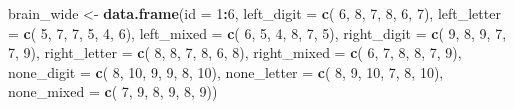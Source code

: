 \documentclass[
]{article}
\newenvironment{Shaded}{\begin{snugshade}}{\end{snugshade}}
\newcommand{\DataTypeTok}[1]{\textcolor[rgb]{0.13,0.29,0.53}{#1}}
\newcommand{\DecValTok}[1]{\textcolor[rgb]{0.00,0.00,0.81}{#1}}
\newcommand{\KeywordTok}[1]{\textcolor[rgb]{0.13,0.29,0.53}{\textbf{#1}}}
\newcommand{\NormalTok}[1]{#1}
\newcommand{\OperatorTok}[1]{\textcolor[rgb]{0.81,0.36,0.00}{\textbf{#1}}}
\newcommand{\StringTok}[1]{\textcolor[rgb]{0.31,0.60,0.02}{#1}}
\begin{document}
\begin{Shaded}
\begin{Highlighting}[]
\NormalTok{brain_wide <-}\StringTok{ }\KeywordTok{data.frame}\NormalTok{(}\DataTypeTok{id =} \DecValTok{1}\OperatorTok{:}\DecValTok{6}\NormalTok{,}
                         \DataTypeTok{left_digit   =} \KeywordTok{c}\NormalTok{( }\DecValTok{6}\NormalTok{,  }\DecValTok{8}\NormalTok{,  }\DecValTok{7}\NormalTok{,  }\DecValTok{8}\NormalTok{,  }\DecValTok{6}\NormalTok{,  }\DecValTok{7}\NormalTok{),}
                         \DataTypeTok{left_letter  =} \KeywordTok{c}\NormalTok{( }\DecValTok{5}\NormalTok{,  }\DecValTok{7}\NormalTok{,  }\DecValTok{7}\NormalTok{,  }\DecValTok{5}\NormalTok{,  }\DecValTok{4}\NormalTok{,  }\DecValTok{6}\NormalTok{),}
                         \DataTypeTok{left_mixed   =} \KeywordTok{c}\NormalTok{( }\DecValTok{6}\NormalTok{,  }\DecValTok{5}\NormalTok{,  }\DecValTok{4}\NormalTok{,  }\DecValTok{8}\NormalTok{,  }\DecValTok{7}\NormalTok{,  }\DecValTok{5}\NormalTok{),}
                         \DataTypeTok{right_digit  =} \KeywordTok{c}\NormalTok{( }\DecValTok{9}\NormalTok{,  }\DecValTok{8}\NormalTok{,  }\DecValTok{9}\NormalTok{,  }\DecValTok{7}\NormalTok{,  }\DecValTok{7}\NormalTok{,  }\DecValTok{9}\NormalTok{),}
                         \DataTypeTok{right_letter =} \KeywordTok{c}\NormalTok{( }\DecValTok{8}\NormalTok{,  }\DecValTok{8}\NormalTok{,  }\DecValTok{7}\NormalTok{,  }\DecValTok{8}\NormalTok{,  }\DecValTok{6}\NormalTok{,  }\DecValTok{8}\NormalTok{),}
                         \DataTypeTok{right_mixed  =} \KeywordTok{c}\NormalTok{( }\DecValTok{6}\NormalTok{,  }\DecValTok{7}\NormalTok{,  }\DecValTok{8}\NormalTok{,  }\DecValTok{8}\NormalTok{,  }\DecValTok{7}\NormalTok{,  }\DecValTok{9}\NormalTok{),}
                         \DataTypeTok{none_digit   =} \KeywordTok{c}\NormalTok{( }\DecValTok{8}\NormalTok{, }\DecValTok{10}\NormalTok{,  }\DecValTok{9}\NormalTok{,  }\DecValTok{9}\NormalTok{,  }\DecValTok{8}\NormalTok{, }\DecValTok{10}\NormalTok{),}
                         \DataTypeTok{none_letter  =} \KeywordTok{c}\NormalTok{( }\DecValTok{8}\NormalTok{,  }\DecValTok{9}\NormalTok{, }\DecValTok{10}\NormalTok{,  }\DecValTok{7}\NormalTok{,  }\DecValTok{8}\NormalTok{, }\DecValTok{10}\NormalTok{),}
                         \DataTypeTok{none_mixed   =} \KeywordTok{c}\NormalTok{( }\DecValTok{7}\NormalTok{,  }\DecValTok{9}\NormalTok{,  }\DecValTok{8}\NormalTok{,  }\DecValTok{9}\NormalTok{,  }\DecValTok{8}\NormalTok{,  }\DecValTok{9}\NormalTok{))}
\end{Highlighting}
\end{Shaded}

\clearpage
\end{document}
